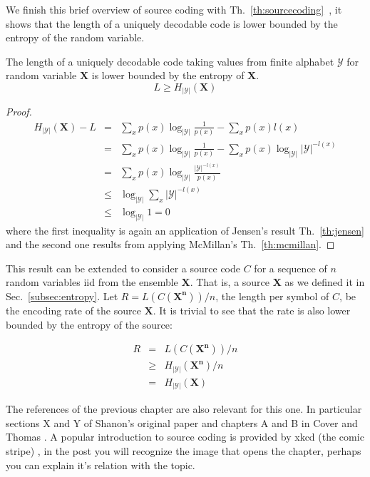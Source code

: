 We finish this brief overview of source coding with Th.~\ref{th:sourcecoding}~\cite{Cover_91}, it shows that the length  of a uniquely decodable code is lower bounded by the entropy of the random variable.
\begin{theorem}
\label{th:sourcecoding}
The length of a uniquely decodable code taking values from finite alphabet $\mathcal{Y}$ for random variable $\mathbf{X}$ is lower bounded by the entropy of $\mathbf{X}$.
\begin{equation*}
L\geq H_{|\mathcal{Y}|}(\mathbf{X})
\end{equation*}
\end{theorem}
\begin{proof}
\begin{eqnarray}
H_{|\mathcal{Y}|}(\mathbf{X}) - L &=& \sum_{x} p(x) \log_{|\mathcal{Y}|} \frac{1}{p(x)} - \sum_{x}p(x)l(x) \nonumber \\
                                      &=& \sum_{x} p(x) \log_{|\mathcal{Y}|} \frac{1}{p(x)} - \sum_{x} p(x)  \log_{|\mathcal{Y}|} |\mathcal{Y}|^{-l(x)} \nonumber \\
                                      &=& \sum_{x} p(x) \log_{|\mathcal{Y}|} \frac{|\mathcal{Y}|^{-l(x)} }{p(x)} \nonumber \\
                                      &\leq & \log_{|\mathcal{Y}|} \sum_{x} |\mathcal{Y}|^{-l(x)} \nonumber \\
                                      &\leq & \log_{|\mathcal{Y}|} 1 = 0
\end{eqnarray}
\noindent where the first inequality is again an application of Jensen's result Th.~\ref{th:jensen} and the second one results from applying McMillan's Th.~\ref{th:mcmillan}.
\end{proof}

This result can be extended to consider a source code $C$ for a sequence of $n$ random variables {iid} from the ensemble $\mathbf{X}$. That is, a source  $\mathbf{X}$ as we defined it in Sec.~\ref{subsec:entropy}. Let $R=L(C(\mathbf {X^n}))/n$, the length per symbol of $C$, be the encoding rate of the source $\mathbf{X}$. It is trivial to see that the rate is also lower bounded by the entropy of the source:

\begin{eqnarray}
R &=& L(C(\mathbf {X^n}))/n \nonumber\\
  &\geq& H_{|\mathcal{Y}|}(\mathbf{X^n})/n \nonumber\\
 &=& H_{|\mathcal{Y}|}(\mathbf{X})
\end{eqnarray}

The references of the previous chapter are also relevant for this one. In particular sections X and Y of Shanon's original paper \cite{} and chapters A and B in Cover and Thomas \cite{}. A popular introduction to source coding is provided by xkcd (the comic stripe) \cite{}, in the post you will recognize the image that opens the chapter, perhaps you can explain it's relation with the topic. %
